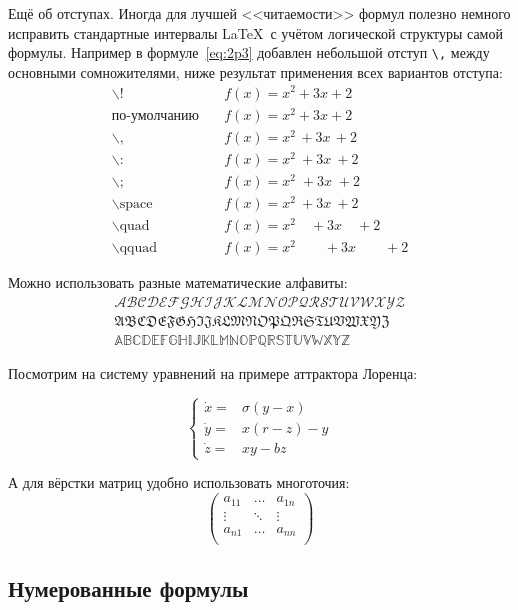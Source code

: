 Ещё об отступах. Иногда для лучшей <<читаемости>> формул полезно
немного исправить стандартные интервалы \LaTeX\ с учётом логической
структуры самой формулы. Например в формуле~\ref{eq:2p3} добавлен
небольшой отступ \verb+\,+ между основными сомножителями, ниже
результат применения всех вариантов отступа:
\begin{align*}
\backslash! &\quad f(x) = x^2\! +3x\! +2 \\
  \mbox{по-умолчанию} &\quad f(x) = x^2+3x+2 \\
\backslash, &\quad f(x) = x^2\, +3x\, +2 \\
\backslash{:} &\quad f(x) = x^2\: +3x\: +2 \\
\backslash; &\quad f(x) = x^2\; +3x\; +2 \\
\backslash \mbox{space} &\quad f(x) = x^2\ +3x\ +2 \\
\backslash \mbox{quad} &\quad f(x) = x^2\quad +3x\quad +2 \\
\backslash \mbox{qquad} &\quad f(x) = x^2\qquad +3x\qquad +2
\end{align*}


Можно использовать разные математические алфавиты:
\begin{align}
\mathcal{ABCDEFGHIJKLMNOPQRSTUVWXYZ} \nonumber \\
\mathfrak{ABCDEFGHIJKLMNOPQRSTUVWXYZ} \nonumber \\
\mathbb{ABCDEFGHIJKLMNOPQRSTUVWXYZ} \nonumber
\end{align}

Посмотрим на систему уравнений на примере аттрактора Лоренца:

\[ 
\left\{
  \begin{array}{rl}
    \dot x = & \sigma (y-x) \\
    \dot y = & x (r - z) - y \\
    \dot z = & xy - bz
  \end{array}
\right.
\]

А для вёрстки матриц удобно использовать многоточия:
\[ 
\left(
  \begin{array}{ccc}
    a_{11} & \ldots & a_{1n} \\
    \vdots & \ddots & \vdots \\
    a_{n1} & \ldots & a_{nn} \\
  \end{array}
\right)
\]


\subsection{Нумерованные формулы} \label{subsect1_3_3}

